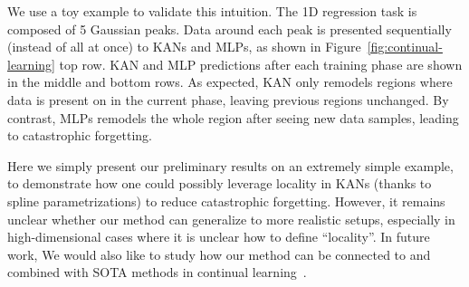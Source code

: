 \documentclass{article}
\numberwithin{equation}{section}
\numberwithin{figure}{section}
\begin{document}
We use a toy example to validate this intuition. The 1D regression task is composed of 5 Gaussian peaks. Data around each peak is presented sequentially (instead of all at once) to KANs and MLPs, as shown in Figure~\ref{fig:continual-learning} top row. KAN and MLP predictions after each training phase are shown in the middle and bottom rows. As expected, KAN only remodels regions where data is present on in the current phase, leaving previous regions unchanged. By contrast, MLPs remodels the whole region after seeing new data samples, leading to catastrophic forgetting. 

Here we simply present our preliminary results on an extremely simple example, to demonstrate how one could possibly leverage locality in KANs (thanks to spline parametrizations) to reduce catastrophic forgetting. However, it remains unclear whether our method can generalize to more realistic setups, especially in high-dimensional cases where it is unclear how to define ``locality''. In future work, We would also like to study how our method can be connected to and combined with SOTA methods in continual learning~\cite{kirkpatrick2017overcoming,lu2024revisiting}.

\end{document}
